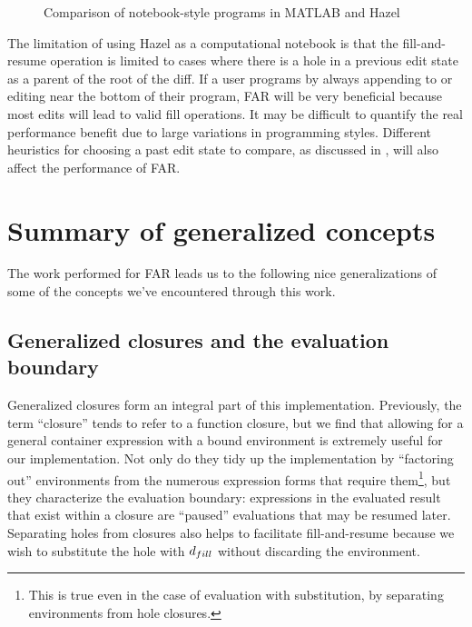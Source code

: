 \begin{figure}
  \centering
  \begin{singlespace}
  \end{singlespace}
  \caption{Comparison of notebook-style programs in MATLAB and Hazel}
  \label{fig:notebook-comparison}
\end{figure}

The limitation of using Hazel as a computational notebook is that the fill-and-resume operation is limited to cases where there is a hole in a previous edit state as a parent of the root of the diff. If a user programs by always appending to or editing near the bottom of their program, FAR will be very beneficial because most edits will lead to valid fill operations. It may be difficult to quantify the real performance benefit due to large variations in programming styles. Different heuristics for choosing a past edit state to compare, as discussed in , will also affect the performance of FAR.

\section{Summary of generalized concepts}
\label{sec:summary-generalizations}

The work performed for FAR leads us to the following nice generalizations of some of the concepts we've encountered through this work.

\subsection{Generalized closures and the evaluation boundary}
\label{sec:generalized-closures}

Generalized closures form an integral part of this implementation. Previously, the term ``closure'' tends to refer to a function closure, but we find that allowing for a general container expression with a bound environment is extremely useful for our implementation. Not only do they tidy up the implementation by ``factoring out'' environments from the numerous expression forms that require them\footnote{This is true even in the case of evaluation with substitution, by separating environments from hole closures.}, but they characterize the evaluation boundary: expressions in the evaluated result that exist within a closure are ``paused'' evaluations that may be resumed later. Separating holes from closures also helps to facilitate fill-and-resume because we wish to substitute the hole with $d_{fill}$ without discarding the environment.

